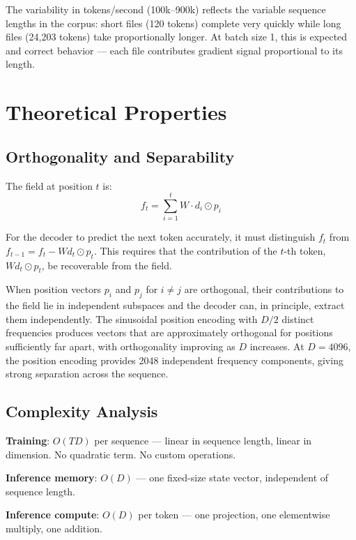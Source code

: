 \documentclass[11pt]{article}
\begin{document}
The variability in tokens/second (100k--900k) reflects the variable sequence lengths in the corpus: short files (120 tokens) complete very quickly while long files (24,203 tokens) take proportionally longer. At batch size 1, this is expected and correct behavior — each file contributes gradient signal proportional to its length.

\section{Theoretical Properties}

\subsection{Orthogonality and Separability}

The field at position $t$ is:
\begin{equation}
f_t = \sum_{i=1}^{t} W \cdot d_i \odot p_i
\end{equation}

For the decoder to predict the next token accurately, it must distinguish $f_t$ from $f_{t-1} = f_t - W d_t \odot p_t$. This requires that the contribution of the $t$-th token, $W d_t \odot p_t$, be recoverable from the field.

When position vectors $p_i$ and $p_j$ for $i \neq j$ are orthogonal, their contributions to the field lie in independent subspaces and the decoder can, in principle, extract them independently. The sinusoidal position encoding with $D/2$ distinct frequencies produces vectors that are approximately orthogonal for positions sufficiently far apart, with orthogonality improving as $D$ increases. At $D = 4096$, the position encoding provides 2048 independent frequency components, giving strong separation across the sequence.

\subsection{Complexity Analysis}

\textbf{Training}: $O(TD)$ per sequence — linear in sequence length, linear in dimension. No quadratic term. No custom operations.

\textbf{Inference memory}: $O(D)$ — one fixed-size state vector, independent of sequence length.

\textbf{Inference compute}: $O(D)$ per token — one projection, one elementwise multiply, one addition.
\end{document}
